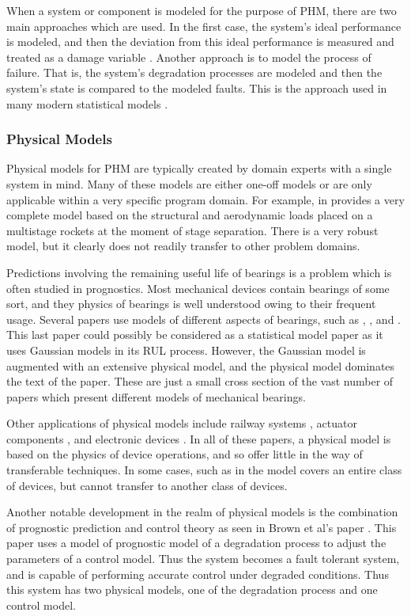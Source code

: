 \documentclass[12pt]{article}
\begin{document}
When a system or component is modeled for the purpose of PHM, there
are two main approaches which are used.  In the first case, the
system's ideal performance is modeled, and then the deviation from
this ideal performance is measured and treated as a damage variable
\cite{1569256}.  Another approach is to model the process of failure.
That is, the system's degradation processes are modeled and then the
system's state is compared to the modeled faults.  This is the
approach used in many modern statistical models \cite{4925841}.

\subsubsection{Physical Models}
Physical models for PHM are typically created by domain experts with a
single system in mind.  Many of these models are either one-off models
or are only applicable within a very specific program domain.  For
example, in \cite{5747595} provides a very complete model based on the
structural and aerodynamic loads placed on a multistage rockets at the
moment of stage separation.  There is a very robust model, but it
clearly does not readily transfer to other problem domains.

Predictions involving the remaining useful life of bearings is a
problem which is often studied in prognostics.  Most mechanical
devices contain bearings of some sort, and they physics of bearings is
well understood owing to their frequent usage.  Several papers use
models of different aspects of bearings, such as \cite{5531344},
\cite{1656121}, and \cite{6299545}.  This last paper could possibly be
considered as a statistical model paper as it uses Gaussian models in
its RUL process.  However, the Gaussian model is augmented with an
extensive physical model, and the physical model dominates the text of
the paper.  These are just a small cross section of the vast number of
papers which present different models of mechanical bearings.

Other applications of physical models include railway systems
\cite{5747204}, actuator components \cite{5979041}, and electronic
devices \cite{5464512}.  In all of these papers, a physical model is
based on the physics of device operations, and so offer little in the
way of transferable techniques.  In some cases, such as in
\cite{5979041} the model covers an entire class of devices, but cannot
transfer to another class of devices.

Another notable development in the realm of physical models is the combination
of prognostic prediction and control theory as seen in Brown et al's paper
\cite{5547651}.  This paper uses a model of prognostic model of a degradation
process to adjust the parameters of a control model.  Thus the system becomes a
fault tolerant system, and is capable of performing accurate control under
degraded conditions.  Thus this system has two physical models, one of the
degradation process and one control model.
\end{document}
